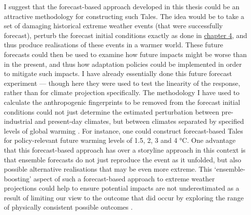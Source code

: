       I suggest that the forecast-based approach developed in this thesis could be an attractive methodology for constructing such Tales. The idea would be to take a set of damaging historical extreme weather events (that were successfully forecast), perturb the forecast initial conditions exactly as done in \hyperref[ch4]{chapter 4}, and thus produce realisations of these events in a warmer world. These future forecasts could then be used to examine how future impacts might be worse than in the present, and thus how adaptation policies could be implemented in order to mitigate such impacts. I have already essentially done this future forecast experiment --- though here they were used to test the linearity of the response, rather than for climate projection specifically. The methodology I have used to calculate the anthropogenic fingerprints to be removed from the forecast initial conditions could not just determine the estimated perturbation between pre-industrial and present-day climates, but between climates separated by specified levels of global warming \citep{hasselmann_optimal_1993}. For instance, one could construct forecast-based Tales for policy-relevant future warming levels of 1.5, 2, 3 and 4 °C. One advantage that this forecast-based approach has over a storyline approach \citep[eg.][]{benitez_july_2022} in this context is that ensemble forecasts do not just reproduce the event as it unfolded, but also possible alternative realisations that may be even more extreme. This `ensemble-boosting' aspect of such a forecast-based approach to extreme weather projections could help to ensure potential impacts are not underestimated as a result of limiting our view to the outcome that did occur by exploring the range of physically consistent possible outcomes \citep{gessner_very_2021}.
      
